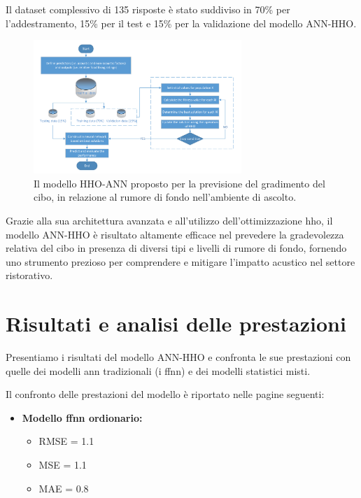 Il dataset complessivo di 135 risposte è stato suddiviso in 70\% per l'addestramento, 15\% per il test e 15\% per la validazione del modello ANN-HHO.

\begin{figure}[H]
      \centering
      \includegraphics[width=0.7\textwidth]{Chapters/Figures/HHO-ANN.png}
      \caption{Il modello HHO-ANN proposto per la previsione del gradimento del cibo, in relazione al rumore di fondo nell'ambiente di ascolto. \cite{alamir2021enhanced}}
      \label{hho-ann}
\end{figure}

Grazie alla sua architettura avanzata e all'utilizzo dell'ottimizzazione \gls{hho}, il modello ANN-HHO è risultato altamente efficace nel prevedere la gradevolezza relativa del cibo in presenza di diversi tipi e livelli di rumore di fondo, fornendo uno strumento prezioso per comprendere e mitigare l'impatto acustico nel settore ristorativo.

\section{Risultati e analisi delle prestazioni}
\noindent

Presentiamo i risultati del modello ANN-HHO e confronta le sue prestazioni con quelle dei modelli \gls{ann} tradizionali (i \gls{ffnn}) e dei modelli statistici misti.

Il confronto delle prestazioni del modello è riportato nelle pagine seguenti:

\newpage 
\begin{itemize}
      \item \textbf{Modello \gls{ffnn} ordionario:}
            \begin{itemize}
                  \item RMSE = 1.1
                  \item MSE = 1.1
                   \item MAE = 0.8
            \end{itemize}       
\end{itemize}

